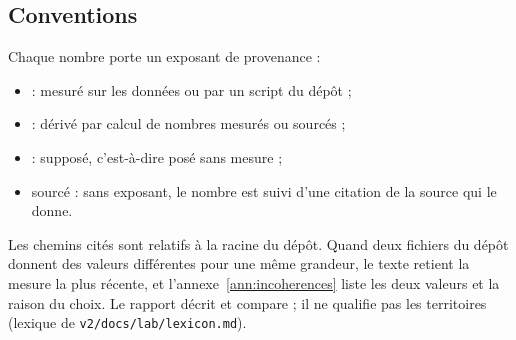 \subsection{Conventions}
Chaque nombre porte un exposant de provenance :
\begin{itemize}
\item \mesure{} : mesuré sur les données ou par un script du dépôt ;
\item \derive{} : dérivé par calcul de nombres mesurés ou sourcés ;
\item \suppose{} : supposé, c'est-à-dire posé sans mesure ;
\item sourcé : sans exposant, le nombre est suivi d'une citation de la source qui le donne.
\end{itemize}
Les chemins cités sont relatifs à la racine du dépôt. Quand deux fichiers du dépôt donnent des valeurs différentes
pour une même grandeur, le texte retient la mesure la plus récente, et l'annexe~\ref{ann:incoherences} liste les
deux valeurs et la raison du choix. Le rapport décrit et compare ; il ne qualifie pas les territoires (lexique de
\texttt{v2/docs/lab/lexicon.md}).


